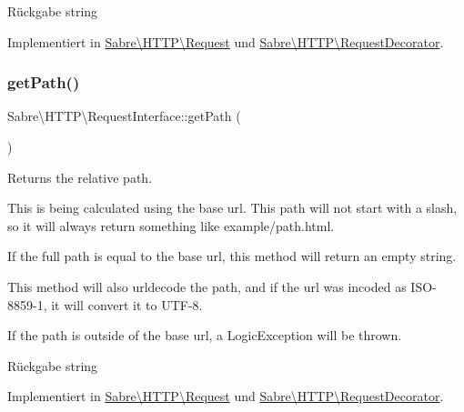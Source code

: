 \begin{DoxyReturn}{Rückgabe}
string 
\end{DoxyReturn}


Implementiert in \mbox{\hyperlink{class_sabre_1_1_h_t_t_p_1_1_request_abdb8452dd585c99e63248dfe22a6d57d}{Sabre\textbackslash{}\+H\+T\+T\+P\textbackslash{}\+Request}} und \mbox{\hyperlink{class_sabre_1_1_h_t_t_p_1_1_request_decorator_a696811a053a65fafc920dbdfde0bd545}{Sabre\textbackslash{}\+H\+T\+T\+P\textbackslash{}\+Request\+Decorator}}.

\mbox{\label{interface_sabre_1_1_h_t_t_p_1_1_request_interface_aea4dd5571c841fa1e41b05813299bae4}} 
\subsubsection{\texorpdfstring{get\+Path()}{getPath()}}
{\footnotesize\ttfamily Sabre\textbackslash{}\+H\+T\+T\+P\textbackslash{}\+Request\+Interface\+::get\+Path (\begin{DoxyParamCaption}{ }\end{DoxyParamCaption})}

Returns the relative path.

This is being calculated using the base url. This path will not start with a slash, so it will always return something like \textquotesingle{}example/path.\+html\textquotesingle{}.

If the full path is equal to the base url, this method will return an empty string.

This method will also urldecode the path, and if the url was incoded as I\+S\+O-\/8859-\/1, it will convert it to U\+T\+F-\/8.

If the path is outside of the base url, a Logic\+Exception will be thrown.

\begin{DoxyReturn}{Rückgabe}
string 
\end{DoxyReturn}


Implementiert in \mbox{\hyperlink{class_sabre_1_1_h_t_t_p_1_1_request_ab484327e7fcdadc5caca615eeb436cf8}{Sabre\textbackslash{}\+H\+T\+T\+P\textbackslash{}\+Request}} und \mbox{\hyperlink{class_sabre_1_1_h_t_t_p_1_1_request_decorator_a4349070826f60655b60ea18a61dc8c3c}{Sabre\textbackslash{}\+H\+T\+T\+P\textbackslash{}\+Request\+Decorator}}.


